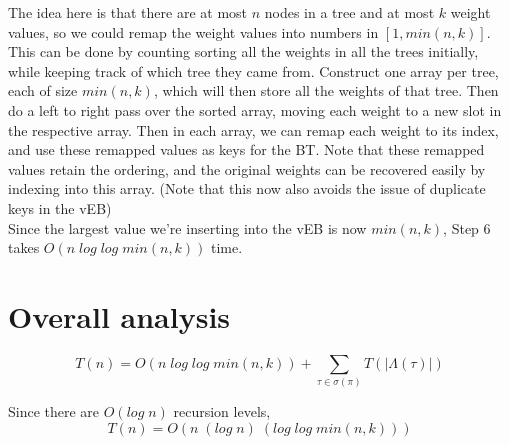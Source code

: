 \documentclass[a4paper]{article}
\begin{document}
    The idea here is that there are at most $n$ nodes in a tree and at most $k$ weight values, so we could remap the weight values into numbers in $[1, min(n, k)]$. This can be done by counting sorting all the weights in all the trees initially, while keeping track of which tree they came from. Construct one array per tree, each of size $min(n, k)$, which will then store all the weights of that tree. Then do a left to right pass over the sorted array, moving each weight to a new slot in the respective array. Then in each array, we can remap each weight to its index, and use these remapped values as keys for the BT. Note that these remapped values retain the ordering, and the original weights can be recovered easily by indexing into this array. (Note that this now also avoids the issue of duplicate keys in the vEB)\\

    Since the largest value we're inserting into the vEB is now $min(n, k)$, Step 6 takes $O(n\;log\;log\;min(n, k))$ time.

    \section{Overall analysis}

    \[T(n) = O(n\;log\;log\;min(n, k)) + \sum_{\tau\in\sigma(\pi)}T(|\Lambda(\tau)|)\]

    Since there are $O(log\;n)$ recursion levels,
    \[T(n) = O(n\;(log\;n)\;(log\;log\;min(n, k)))\]
\end{document}
